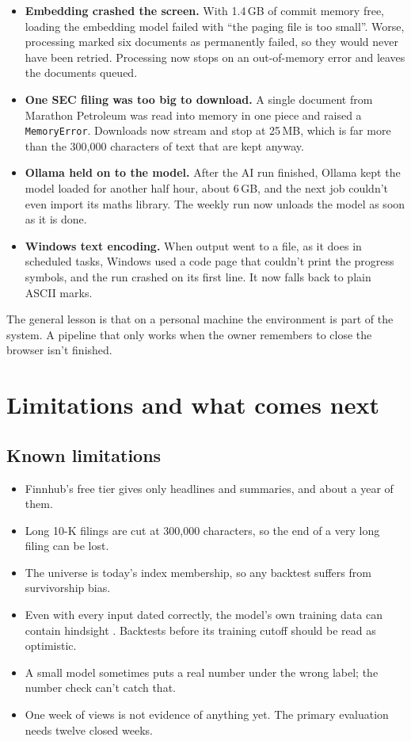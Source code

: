 \documentclass[11pt,a4paper]{article}
\newcommand{\code}[1]{\texttt{#1}}
\begin{document}
\begin{itemize}
  \item \textbf{Embedding crashed the screen.} With 1.4\,GB of commit memory free, loading the embedding model
        failed with ``the paging file is too small''. Worse, processing marked six documents as permanently
        failed, so they would never have been retried. Processing now stops on an out-of-memory error and
        leaves the documents queued.
  \item \textbf{One SEC filing was too big to download.} A single document from Marathon Petroleum was read
        into memory in one piece and raised a \code{MemoryError}. Downloads now stream and stop at 25\,MB,
        which is far more than the 300,000 characters of text that are kept anyway.
  \item \textbf{Ollama held on to the model.} After the AI run finished, Ollama kept the model loaded for
        another half hour, about 6\,GB, and the next job couldn't even import its maths library. The weekly
        run now unloads the model as soon as it is done.
  \item \textbf{Windows text encoding.} When output went to a file, as it does in scheduled tasks, Windows
        used a code page that couldn't print the progress symbols, and the run crashed on its first line. It
        now falls back to plain ASCII marks.
\end{itemize}

The general lesson is that on a personal machine the environment is part of the system. A pipeline that
only works when the owner remembers to close the browser isn't finished.

\section{Limitations and what comes next}

\subsection{Known limitations}

\begin{itemize}
  \item Finnhub's free tier gives only headlines and summaries, and about a year of them.
  \item Long 10-K filings are cut at 300,000 characters, so the end of a very long filing can be lost.
  \item The universe is today's index membership, so any backtest suffers from survivorship bias.
  \item Even with every input dated correctly, the model's own training data can contain hindsight
        \cite{glasserman2023assessing}. Backtests before its training cutoff should be read as optimistic.
  \item A small model sometimes puts a real number under the wrong label; the number check can't catch that.
  \item One week of views is not evidence of anything yet. The primary evaluation needs twelve closed weeks.
\end{itemize}
\end{document}
